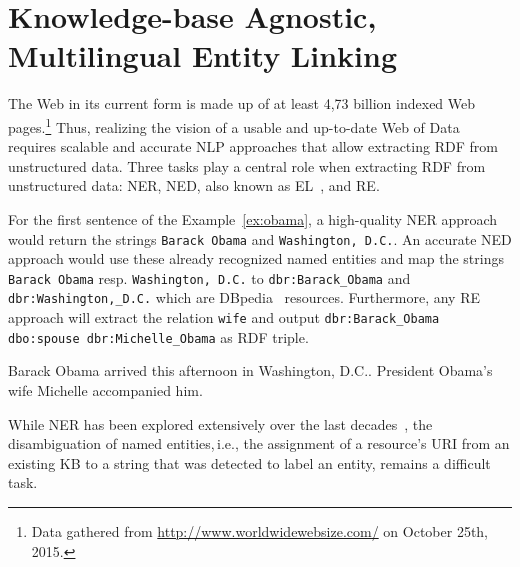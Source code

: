 
\chapter{Knowledge-base Agnostic, Multilingual Entity Linking}
\label{cha:agdistis}

The Web in its current form is made up of at least 4,73  billion indexed Web pages.\footnote{Data gathered from \url{http://www.worldwidewebsize.com/} on October 25th, 2015.}
Thus, realizing the vision of a usable and up-to-date Web of Data requires scalable and accurate \ac{NLP} approaches that allow extracting \ac{RDF} from  unstructured data.
Three tasks play a central role when extracting \ac{RDF} from unstructured data:  \ac{NER}, \ac{NED}, also known as \ac{EL}~\cite{Mihalcea:2007:WLD:1321440.1321475}, and \ac{RE}.

For the first sentence of the Example~\ref{ex:obama}, a high-quality \ac{NER} approach would return the strings \texttt{Barack Obama} and \texttt{Washington, D.C.}.
An accurate \ac{NED} approach would use these already recognized named entities and map the strings \texttt{Barack Obama} resp. \texttt{Washington, D.C.} to \texttt{dbr:Barack\_Obama} and \texttt{dbr:Washington,\_D.C.} which are DBpedia~\cite{dbpedia-swj} resources. 
Furthermore, any \ac{RE} approach will extract the relation \texttt{wife} and output \texttt{dbr:Barack\_Obama dbo:spouse dbr:Michelle\_Obama} as RDF triple.
\begin{ex}
Barack Obama arrived this afternoon in Washington, D.C.. President Obama's wife Michelle accompanied him.
\label{ex:obama}
\end{ex}
While \ac{NER} has been explored extensively over the last decades~\cite{StanfordNER}, the disambiguation of named entities,\,i.e., the assignment of a resource's URI from an existing \ac{KB} to a string that was detected to label an entity, remains a difficult task.

